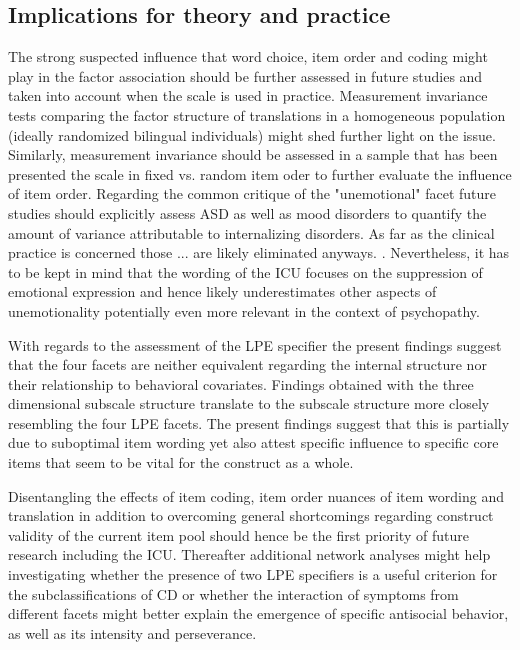   \subsection{Implications for theory and practice}
 The strong suspected influence that word choice, item order and coding might play in the factor association should be further assessed in future studies and taken into account when the scale is used in practice.
 Measurement invariance tests comparing the factor structure of translations in a homogeneous population (ideally randomized bilingual individuals) might shed further light on the issue.
 Similarly, measurement invariance should be assessed in a sample that has been presented the scale in fixed vs. random item oder to further evaluate the influence of item order.
 Regarding the common critique of the "unemotional" facet  future studies should explicitly assess ASD as well as mood disorders to quantify the amount of variance attributable to internalizing disorders.
 As far as the clinical practice is concerned those ... are likely eliminated anyways. . 
 Nevertheless, it has to be kept in mind that the wording of the ICU focuses on the suppression of emotional expression and hence likely underestimates other aspects of unemotionality potentially even more relevant in the context of psychopathy.
 
 With regards to the assessment of the LPE specifier the present findings suggest that the four facets are neither equivalent regarding the internal structure nor their relationship to behavioral covariates. Findings obtained with the three dimensional subscale structure translate to the subscale structure more closely resembling the four LPE facets.
 The present findings suggest that this is partially due to suboptimal item wording yet also attest specific influence to specific core items that seem to be vital for the construct as a whole.
 
 Disentangling the effects of item coding, item order nuances of item wording and translation in addition to overcoming general shortcomings regarding construct validity of the current item pool should hence be the first priority of future research including the ICU. 
 Thereafter additional network analyses might help investigating whether the presence of two LPE specifiers is a useful criterion for the subclassifications of CD or whether the interaction of symptoms from different facets might better explain the emergence of specific antisocial behavior, as well as its intensity and perseverance.   
 
